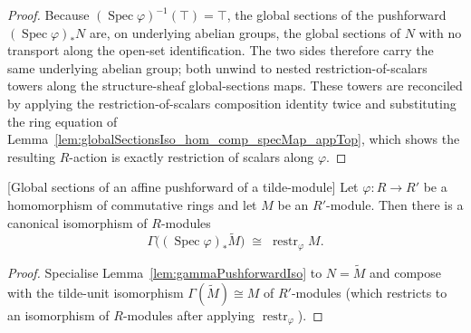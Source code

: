 \begin{proof}
  Because \((\operatorname{Spec}\varphi)^{-1}(\top) = \top\), the global sections of
  the pushforward \((\operatorname{Spec}\varphi)_* N\) are, on underlying abelian
  groups, the global sections of \(N\) with no transport along the open-set
  identification. The two sides therefore carry the same underlying abelian group;
  both unwind to nested restriction-of-scalars towers along the structure-sheaf
  global-sections maps. These towers are reconciled by applying the
  restriction-of-scalars composition identity twice and substituting the ring
  equation of
  Lemma~\ref{lem:globalSectionsIso_hom_comp_specMap_appTop}, which shows the
  resulting \(R\)-action is exactly restriction of scalars along \(\varphi\).
\end{proof}

\begin{lemma}


[Global sections of an affine pushforward of a tilde-module]
  \label{lem:gammaPushforwardTildeIso}
  Let \(\varphi : R \to R'\) be a homomorphism of commutative rings and let \(M\)
  be an \(R'\)-module. Then there is a canonical isomorphism of \(R\)-modules
  \[
    \Gamma\bigl((\operatorname{Spec}\varphi)_* \widetilde{M}\bigr)
    \;\cong\;
    \operatorname{restr}_\varphi M .
  \]
\end{lemma}

\begin{proof}
  Specialise Lemma~\ref{lem:gammaPushforwardIso} to \(N = \widetilde{M}\) and
  compose with the tilde-unit isomorphism
  \(\Gamma(\widetilde{M}) \cong M\) of \(R'\)-modules (which restricts to an
  isomorphism of \(R\)-modules after applying \(\operatorname{restr}_\varphi\)).
\end{proof}

